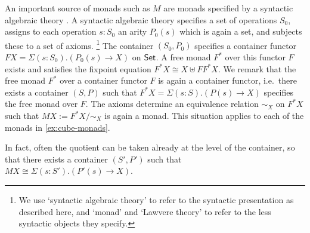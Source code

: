 \documentclass[a4paper]{memoir}
\begin{document}
\begin{remark}
An important source of monads such as $M$ are monads specified by a syntactic algebraic theory \cite{manes-book,adamek-book,keml-diagrams}.
A syntactic algebraic theory specifies a set of operations $S_0$, assigns to each operation $s : S_0$ an arity $P_0(s)$ which is again a set, and subjects these to a set of axioms.%
\footnote{We use `syntactic algebraic theory' to refer to the syntactic presentation as described here, and `monad' and `Lawvere theory' to refer to the less syntactic objects they specify.
%
}
The container $(S_0, P_0)$ specifies a container functor $FX = \Sigma(s : S_0).(P_0(s) \to X)$ on ${\mathsf{Set}}$.
A free monad $F^*$ over this functor $F$ exists and satisfies the fixpoint equation $F^* X \cong X \uplus F F^* X$.
We remark that the free monad $F^*$ over a container functor $F$ is again a container functor, i.e.\ there exists a container $(S, P)$ such that
$F^* X = \Sigma(s : S).(P(s) \to X)$
specifies the free monad over $F$.
The axioms determine an equivalence relation $\sim_X$ on $F^* X$ such that $M X := F^* X/\sim_X$ is again a monad.
This situation applies to each of the monads in \cref{ex:cube-monads}.

In fact, often the quotient can be taken already at the level of the container, so that there exists a container $(S', P')$ such that $MX \cong \Sigma(s : S').(P'(s) \to X)$.
\end{remark}
\end{document}
